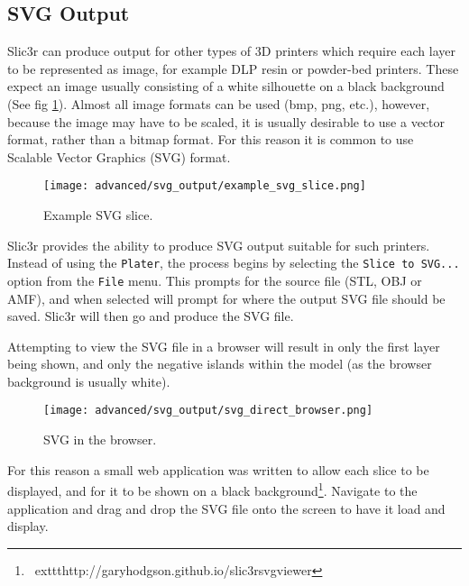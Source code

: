 
\subsection{SVG Output} %
\label{sec:svg_output}

Slic3r can produce output for other types of 3D printers which require each layer to be represented as image, for example DLP resin or powder-bed printers.  These expect an image usually consisting of a white silhouette on a black background (See fig \ref{fig:example_svg_slice}).  Almost all image formats can be used (bmp, png, etc.), however, because the image may have to be scaled, it is usually desirable to use a vector format, rather than a bitmap format.  For this reason it is common to use Scalable Vector Graphics (SVG) format.

\begin{figure}[H]
\centering
\texttt{[image: advanced/svg\_output/example\_svg\_slice.png]}
\caption{Example SVG slice.}
\label{fig:example_svg_slice}
\end{figure}


Slic3r provides the ability to produce SVG output suitable for such printers.  Instead of using the \texttt{Plater}, the process begins by selecting the \texttt{Slice to SVG...} option from the \texttt{File} menu.  This prompts for the source file (STL, OBJ or AMF), and when selected will prompt for where the output SVG file should be saved.  Slic3r will then go and produce the SVG file.

Attempting to view the SVG file in a browser will result in only the first layer being shown, and only the negative islands within the model (as the browser background is usually white).

\begin{figure}[H]
\centering
\texttt{[image: advanced/svg\_output/svg\_direct\_browser.png]}
\caption{SVG in the browser.}
\label{fig:svg_direct_browser}
\end{figure}

For this reason a small web application was written to allow each slice to be displayed, and for it to be shown on a black background\footnote{\	exttt{http://garyhodgson.github.io/slic3rsvgviewer}}.  Navigate to the application and drag and drop the SVG file onto the screen to have it load and display.

